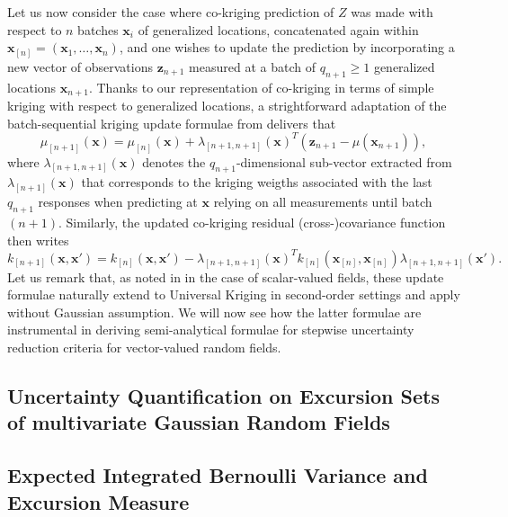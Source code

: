 Let us now consider the case where co-kriging prediction of $Z$ was made with respect to $n$ batches $\bm{x}_i$ of generalized locations, concatenated again within
$\bm{x}_{[n]}=(\bm{x}_1,\dots, \bm{x}_n)$, and one wishes to update the prediction by incorporating a new vector of observations $\mathbf{z}_{n+1}$ measured at a batch of $q_{n+1} \geq 1$ generalized locations $\bm{x}_{n+1}$.
Thanks to our representation of co-kriging in terms of simple kriging with respect to generalized locations, a strightforward adaptation of the batch-sequential kriging update formulae from \cite{Chevalier.etal2013a} delivers that
% 
\begin{equation}
\mu_{[n+1]}(\bm{x})=\mu_{[n]}(\bm{x})+\lambda_{[n+1,n+1]}(\bm{x})^T (\mathbf{z}_{n+1}-\mu(\bm{x}_{n+1})),
\end{equation}
where $\lambda_{[n+1,n+1]}(\bm{x})$ denotes the $q_{n+1}$-dimensional sub-vector extracted from
$\lambda_{[n+1]}(\bm{x})$ that corresponds to the kriging weigths associated with the last $q_{n+1}$ responses when 
predicting at $\bm{x}$ relying on all measurements until batch $(n+1)$.
Similarly, the updated co-kriging residual (cross-)covariance function then writes
\begin{equation}
k_{[n+1]}(\bm{x},\bm{x}')=k_{[n]}(\bm{x},\bm{x}')-\lambda_{[n+1,n+1]}(\bm{x})^T k_{[n]}(\bm{x}_{[n]}, \bm{x}_{[n]}) \lambda_{{[n+1,n+1]}}(\bm{x}').
\end{equation}
%
Let us remark that, as noted in \cite{Chevalier2015} in the case of scalar-valued fields, these update formulae naturally 
extend to Universal Kriging in second-order settings and apply without Gaussian assumption. We will now see how the latter formulae are instrumental in deriving semi-analytical formulae for stepwise uncertainty reduction criteria for 
vector-valued random fields.



\subsection{Uncertainty Quantification on Excursion Sets of multivariate Gaussian Random Fields}
\label{sec:set_uq}


\subsection{Expected Integrated Bernoulli Variance and Excursion Measure}
\label{sec:eibv}





